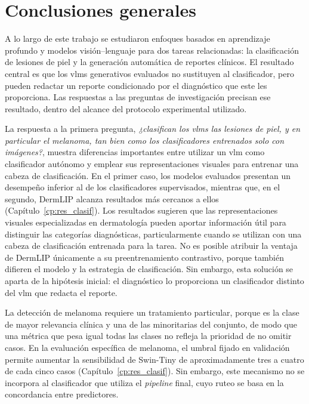 \section{Conclusiones generales}
\label{sec:concl_generales}

A lo largo de este trabajo se estudiaron enfoques basados en aprendizaje profundo y modelos visión--lenguaje para dos
tareas relacionadas: la clasificación de lesiones de piel y la generación automática de reportes clínicos. El resultado
central es que los \glspl{vlm} generativos evaluados no sustituyen al clasificador, pero pueden redactar un reporte
condicionado por el diagnóstico que este les proporciona. Las respuestas a las preguntas de investigación precisan ese
resultado, dentro del alcance del protocolo experimental utilizado.

La respuesta a la primera pregunta, \emph{¿clasifican los \glspl{vlm} las lesiones de piel, y en particular el melanoma, tan bien como los clasificadores entrenados solo con imágenes?}, muestra diferencias importantes entre utilizar un \gls{vlm} como clasificador autónomo y emplear sus representaciones visuales para entrenar una cabeza de clasificación. En el primer caso, los modelos evaluados presentan un desempeño inferior al de los clasificadores supervisados, mientras que, en el segundo, DermLIP alcanza resultados más cercanos a ellos (Capítulo~\ref{cp:res_clasif}). Los resultados sugieren que las representaciones visuales especializadas en dermatología pueden aportar información útil para distinguir las categorías diagnósticas, particularmente cuando se utilizan con una cabeza de clasificación entrenada para la tarea. No es posible atribuir la ventaja de DermLIP únicamente a su preentrenamiento contrastivo, porque también difieren el modelo y la estrategia de clasificación. Sin embargo, esta solución se aparta de la hipótesis inicial: el diagnóstico lo proporciona un clasificador distinto del \gls{vlm} que redacta el reporte.

La detección de melanoma requiere un tratamiento particular, porque es la clase de mayor relevancia clínica y una de las minoritarias del conjunto, de modo que una métrica que pesa igual todas las clases no refleja la prioridad de no omitir casos. En la evaluación específica de melanoma, el umbral fijado en validación permite aumentar la sensibilidad de Swin-Tiny de aproximadamente tres a cuatro de cada cinco casos (Capítulo~\ref{cp:res_clasif}). Sin embargo, este mecanismo no se incorpora al clasificador que utiliza el \emph{pipeline} final, cuyo ruteo se basa en la concordancia entre predictores.

